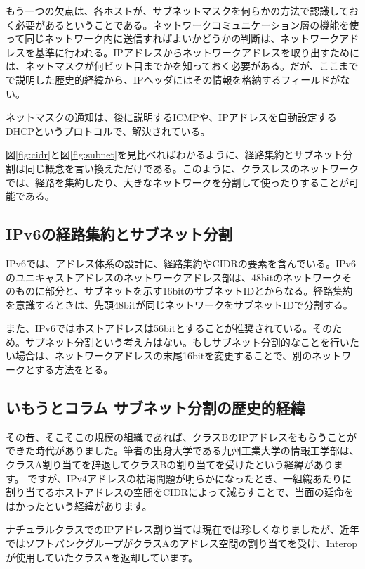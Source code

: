 もう一つの欠点は、各ホストが、サブネットマスクを何らかの方法で認識しておく必要があるということである。ネットワークコミュニケーション層の機能を使って同じネットワーク内に送信すればよいかどうかの判断は、ネットワークアドレスを基準に行われる。IPアドレスからネットワークアドレスを取り出すためには、ネットマスクが何ビット目までかを知っておく必要がある。だが、ここまでで説明した歴史的経緯から、IPヘッダにはその情報を格納するフィールドがない。

ネットマスクの通知は、後に説明するICMPや、IPアドレスを自動設定するDHCPというプロトコルで、解決されている。

図\ref{fig:cidr}と図\ref{fig:subnet}を見比べればわかるように、経路集約とサブネット分割は同じ概念を言い換えただけである。このように、クラスレスのネットワークでは、経路を集約したり、大きなネットワークを分割して使ったりすることが可能である。

\subsection{IPv6の経路集約とサブネット分割}
IPv6では、アドレス体系の設計に、経路集約やCIDRの要素を含んでいる。IPv6のユニキャストアドレスのネットワークアドレス部は、48bitのネットワークそのものに部分と、サブネットを示す16bitのサブネットIDとからなる。経路集約を意識するときは、先頭48bitが同じネットワークをサブネットIDで分割する。

また、IPv6ではホストアドレスは56bitとすることが推奨されている。そのため。サブネット分割という考え方はない。もしサブネット分割的なことを行いたい場合は、ネットワークアドレスの末尾16bitを変更することで、別のネットワークとする方法をとる。

\subsection*{いもうとコラム サブネット分割の歴史的経緯}
その昔、そこそこの規模の組織であれば、クラスBのIPアドレスをもらうことができた時代がありました。筆者の出身大学である九州工業大学の情報工学部は、クラスA割り当てを辞退してクラスBの割り当てを受けたという経緯があります。
ですが、IPv4アドレスの枯渇問題が明らかになったとき、一組織あたりに割り当てるホストアドレスの空間をCIDRによって減らすことで、当面の延命をはかったという経緯があります。

ナチュラルクラスでのIPアドレス割り当ては現在では珍しくなりましたが、近年ではソフトバンクグループがクラスAのアドレス空間の割り当てを受け、Interopが使用していたクラスAを返却しています。




